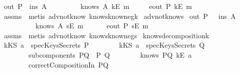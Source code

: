 \begin{isabellebody}
\ {\isachardoublequoteopen}out\ P\ {\isasymsubseteq}\ ins\ A{\isachardoublequoteclose}\isanewline
\ \ \ \ \ \ \ \ {\isachardoublequoteopen}{\isasymnot}\ knows\ A\ {\isacharbrackleft}kE\ m{\isacharbrackright}{\isachardoublequoteclose}\isanewline
{}\ \ \ \ {\isachardoublequoteopen}{\isasymnot}\ eout\ P\ {\isacharparenleft}kE\ m{\isacharparenright}{\isachardoublequoteclose}\isanewline
\isadelimproof
\endisadelimproof
\isatagproof
{}\isamarkupfalse \ assms\ \isamarkupfalse \ {\isacharparenleft}metis\ adv{\isacharunderscore}not{\isacharunderscore}know{}\ knows{}know{\isacharunderscore}neg{\isacharunderscore}k{\isacharparenright}\endisatagproof
{\isafoldproof}\isadelimproof
\isanewline
\endisadelimproof
\isanewline
{}\isamarkupfalse \ adv{\isacharunderscore}not{\isacharunderscore}knows{}{\isacharcolon}\isanewline
{}\ {\isachardoublequoteopen}out\ P\ \ {\isasymsubseteq}\ ins\ A{\isachardoublequoteclose}\isanewline
\ \ \ \ \ \ \ \ \ {\isachardoublequoteopen}{\isasymnot}\ knows\ A\ {\isacharbrackleft}sE\ m{\isacharbrackright}{\isachardoublequoteclose}\ \isanewline
{}\ \ \ \ {\isachardoublequoteopen}{\isasymnot}\ eout\ P\ {\isacharparenleft}sE\ m{\isacharparenright}{\isachardoublequoteclose}\isanewline
\isadelimproof
\endisadelimproof
\isatagproof
{}\isamarkupfalse \ assms\ \isamarkupfalse \ {\isacharparenleft}metis\ adv{\isacharunderscore}not{\isacharunderscore}know{}\ knows{}know{\isacharunderscore}neg{\isacharunderscore}s{\isacharparenright}\endisatagproof
{\isafoldproof}\isadelimproof
\isanewline
\endisadelimproof
\isanewline
{}\isamarkupfalse \ knows{\isacharunderscore}decomposition{\isacharunderscore}{}{\isacharunderscore}k{\isacharcolon}\isanewline
{}\ {\isachardoublequoteopen}kKS\ a\ {\isasymnotin}\ specKeysSecrets\ P{\isachardoublequoteclose}\isanewline
\ \ \ \ \ \ \ \ {\isachardoublequoteopen}kKS\ a\ {\isasymnotin}\ specKeysSecrets\ Q{\isachardoublequoteclose}\isanewline
\ \ \ \ \ \ \ \ {\isachardoublequoteopen}subcomponents\ PQ\ {\isacharequal}\ {\isacharbraceleft}P{\isacharcomma}\ Q{\isacharbraceright}{\isachardoublequoteclose}\isanewline
\ \ \ \ \ \ \ \ {\isachardoublequoteopen}knows\ PQ\ {\isacharbrackleft}kE\ a{\isacharbrackright}{\isachardoublequoteclose}\isanewline
\ \ \ \ \ \ \ \ {\isachardoublequoteopen}correctCompositionIn\ PQ{\isachardoublequoteclose}\isanewline

\end{isabellebody}
